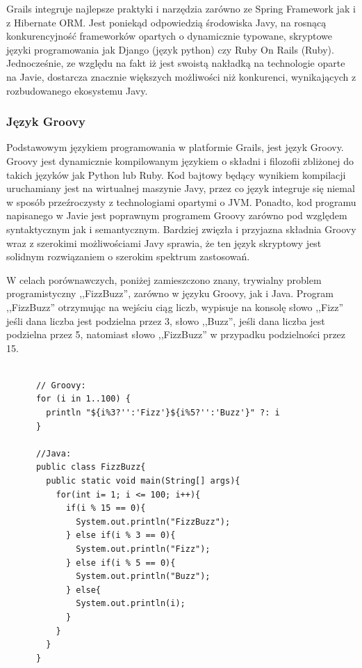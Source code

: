    Grails integruje najlepsze praktyki i narzędzia zarówno ze Spring Framework jak i z Hibernate ORM. Jest poniekąd odpowiedzią środowiska Javy, na rosnącą konkurencyjność frameworków opartych o dynamicznie typowane, skryptowe języki programowania jak Django (język python) czy Ruby On Rails (Ruby). Jednocześnie, ze względu na fakt iż jest swoistą nakładką na technologie oparte na Javie, dostarcza znacznie większych możliwości niż konkurenci, wynikających z rozbudowanego ekosystemu Javy.


    \subsubsection{Język Groovy}

      Podstawowym językiem programowania w platformie Grails, jest język Groovy. Groovy jest dynamicznie kompilowanym językiem o składni i filozofii zbliżonej do takich języków jak Python lub Ruby. Kod bajtowy będący wynikiem kompilacji uruchamiany jest na wirtualnej maszynie Javy, przez co język integruje się niemal w sposób przeźroczysty z technologiami opartymi o JVM. Ponadto, kod programu napisanego w Javie jest poprawnym programem Groovy zarówno pod względem syntaktycznym jak i semantycznym. Bardziej zwięzła i przyjazna składnia Groovy wraz z szerokimi możliwościami Javy sprawia, że ten język skryptowy jest solidnym rozwiązaniem o szerokim spektrum zastosowań.

      W celach porównawczych, poniżej zamieszczono znany, trywialny problem programistyczny ,,FizzBuzz'', zarówno w języku Groovy, jak i Java. Program ,,FizzBuzz'' otrzymując na wejściu ciąg liczb, wypisuje na konsolę słowo ,,Fizz'' jeśli dana liczba jest podzielna przez 3, słowo ,,Buzz'', jeśli dana liczba jest podzielna przez 5, natomiast słowo ,,FizzBuzz'' w przypadku podzielności przez 15.

      \begin{lstlisting}[caption={program FizzBuzz}, label={lst:FizzBuzz}]

      // Groovy:
      for (i in 1..100) {
        println "${i%3?'':'Fizz'}${i%5?'':'Buzz'}" ?: i
      }    

      //Java:
      public class FizzBuzz{
        public static void main(String[] args){
          for(int i= 1; i <= 100; i++){
            if(i % 15 == 0){
              System.out.println("FizzBuzz");
            } else if(i % 3 == 0){
              System.out.println("Fizz");
            } else if(i % 5 == 0){
              System.out.println("Buzz");
            } else{
              System.out.println(i);
            }
          }
        }
      }

    \end{lstlisting}

